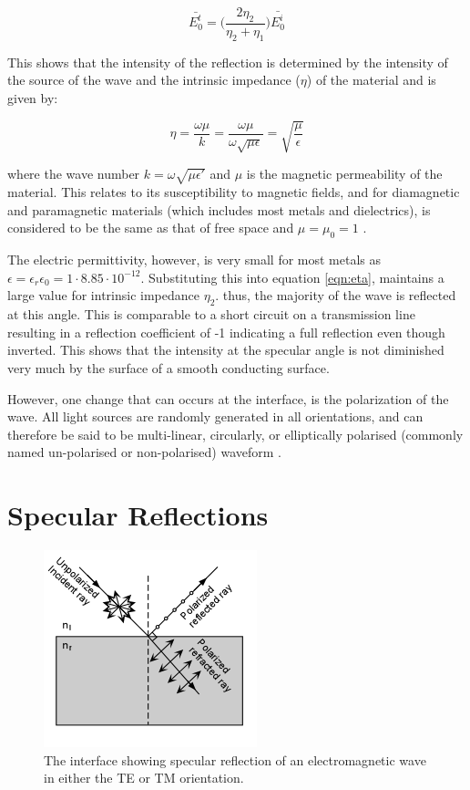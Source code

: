 \documentclass[fleqn,twoside,12pt]{report}
\begin{document}
\begin{equation}
\bar{E_0^t} = \bigg(\frac{2\eta_2}{\eta_2 + \eta_1}\bigg)\bar{E_0^i}
\end{equation}


This shows that the intensity of the reflection is determined by the intensity of the source of the wave and the intrinsic impedance ($\eta$) of the material and is given by:

\begin{equation}
\eta = \frac{\omega \mu}{k} = \frac{\omega \mu}{\omega \sqrt{\mu \epsilon}}= \sqrt{\frac{\mu}{\epsilon}}
\label{eqn:eta}
\end{equation}

where the wave number $k = \omega \sqrt{\mu \epsilon'}$ and $\mu$ is the magnetic permeability of the material. This relates to its susceptibility to magnetic fields, and for diamagnetic and paramagnetic materials (which includes most metals and dielectrics), is considered to be the same as that of free space and $\mu = \mu_0 = 1$ \cite{ulaby}. 

The electric permittivity, however, is very small for most metals as $\epsilon = \epsilon_r \epsilon_0 = 1 \cdot 8.85\cdot10^{-12}$. Substituting this into equation \ref{eqn:eta}, maintains a large value for intrinsic impedance $\eta_2$. thus, the majority of the wave is reflected at this angle. This is comparable to a short circuit on a transmission line resulting in a reflection coefficient of -1 indicating a full reflection even though inverted. This shows that the intensity at the specular angle is not diminished very much by the surface of a smooth conducting surface.

However, one change that can occurs at the interface, is the polarization of the wave. All light sources are randomly generated in all orientations, and can therefore be said to be multi-linear, circularly, or elliptically polarised (commonly named un-polarised or non-polarised) waveform \cite{artusi,nelson}.


\section{Specular Reflections} 

\begin{figure}[h]
	\centering
	\includegraphics[scale=0.9]{unpolar_polar.png}
	\caption{The interface showing specular reflection of an electromagnetic wave in either the TE or TM orientation.}
	\label{fig:unpolar_polar}
\end{figure}
\end{document}
